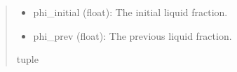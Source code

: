 \documentclass[a4paper,11pt,english,openany]{sphinxmanual}
\begin{document}
\begin{fulllineitems}
\begin{quote}
\begin{description}
\begin{description}
\begin{itemize}
\item {} 
\sphinxAtStartPar
phi\_initial (float): The initial liquid fraction.

\item {} 
\sphinxAtStartPar
phi\_prev (float): The previous liquid fraction.

\end{itemize}

\end{description}


\sphinxAtStartPar
tuple

\end{description}\end{quote}

\end{fulllineitems}

\end{document}

